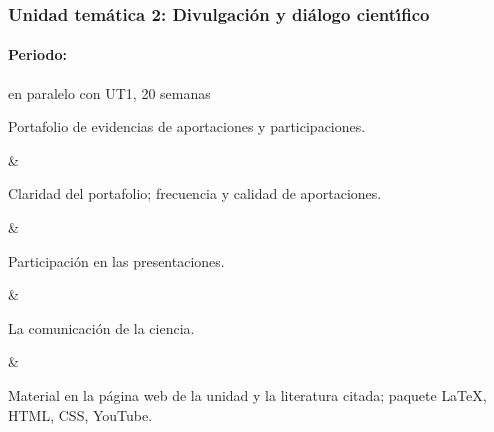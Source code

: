 \subsubsection{Unidad tem\'{a}tica 2: Divulgaci\'{o}n y di\'{a}logo cient\'{\i}fico}

\paragraph{Periodo:} en paralelo con UT1, 20 semanas



Portafolio de evidencias de aportaciones y participaciones.

&

Claridad del portafolio; frecuencia y calidad de aportaciones.

&

Participaci\'{o}n en las presentaciones.

&

La comunicaci\'{o}n de la ciencia.

&

Material en la p\'{a}gina web de la unidad y la literatura citada;
paquete {\LaTeX}, HTML, CSS, YouTube.



